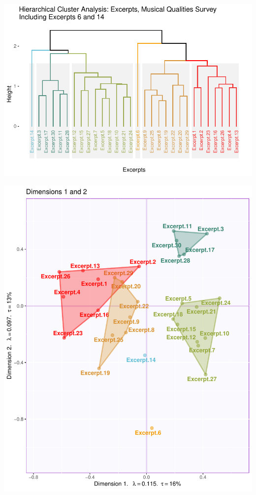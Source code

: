 \documentclass[
]{article}
\begin{document}
\begin{center}\includegraphics{MusDes_Supplementary_files/figure-latex/HCAW6-1} \end{center}

\begin{center}\includegraphics{MusDes_Supplementary_files/figure-latex/excerptsmaps23-1} \end{center}
\end{document}
